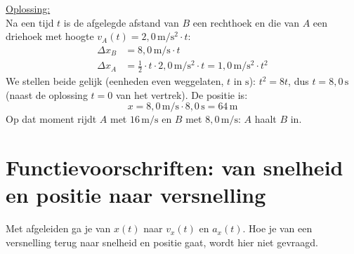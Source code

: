 \documentclass{ximera}
\begin{document}
\begin{exercise}
\begin{question}
\begin{solution}
            \underline{Oplossing:}\\
            Na een tijd $t$ is de afgelegde afstand van $B$ een rechthoek en die van $A$ een driehoek met hoogte $v_A(t) = 2{,}0 \, \mathrm{m/s^2} \cdot t$:
            \begin{align*}
                \Delta x_B &= 8{,}0 \, \mathrm{m/s} \cdot t\\
                \Delta x_A &= \tfrac{1}{2} \cdot t \cdot 2{,}0 \, \mathrm{m/s^2} \cdot t = 1{,}0 \, \mathrm{m/s^2} \cdot t^{2}
            \end{align*}
            We stellen beide gelijk (eenheden even weggelaten, $t$ in $\mathrm{s}$): $t^{2} = 8t$, dus $\boxed{t = 8{,}0 \, \mathrm{s}}$ (naast de oplossing $t = 0$ van het vertrek). De positie is:
            \[
                x = 8{,}0 \, \mathrm{m/s} \cdot 8{,}0 \, \mathrm{s} = \boxed{64 \, \mathrm{m}}
            \]
            Op dat moment rijdt $A$ met $16 \, \mathrm{m/s}$ en $B$ met $8{,}0 \, \mathrm{m/s}$: $A$ haalt $B$ in.
        \end{solution}
    \end{question}
\end{exercise}
\section{Functievoorschriften: van snelheid en positie naar versnelling}
Met afgeleiden ga je van $x(t)$ naar $v_x(t)$ en $a_x(t)$. Hoe je van een versnelling terug naar snelheid en positie gaat, wordt hier niet gevraagd.
\end{document}
